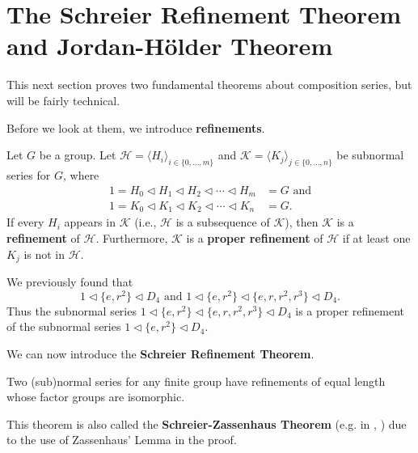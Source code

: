 \section{The Schreier Refinement Theorem and Jordan-H\"older Theorem}
This next section proves two fundamental theorems about composition series, but will be fairly technical.

Before we look at them, we introduce \textbf{refinements}.
\begin{definition}
    Let $G$ be a group. Let $\mathcal{H} = \langle H_i \rangle_{i\in\{0,\dots,m\}}$ and $\mathcal{K} = \langle K_j \rangle_{j\in\{0,\dots,n\}}$ be subnormal series for $G$, where
    \begin{align*}
        1 = H_0 \lhd H_1 \lhd H_2 \lhd \cdots \lhd H_m &= G \text{ and}\\
        1 = K_0 \lhd K_1 \lhd K_2 \lhd \cdots \lhd K_n &= G.
    \end{align*}
    If every $H_i$ appears in $\mathcal{K}$ (i.e., $\mathcal{H}$ is a subsequence of $\mathcal{K}$), then $\mathcal{K}$ is a \textbf{refinement} of $\mathcal{H}$. Furthermore, $\mathcal{K}$ is a \textbf{proper refinement} of $\mathcal{H}$ if at least one $K_j$ is not in $\mathcal{H}$.
\end{definition}
\begin{example}
    We previously found that
    \[
        1 \lhd \{e, r^2\} \lhd D_4 \text{ and } 1 \lhd \{e, r^2\} \lhd \{e, r, r^2, r^3\} \lhd D_4.    
    \]
    Thus the subnormal series $1 \lhd \{e, r^2\} \lhd \{e, r, r^2, r^3\} \lhd D_4$ is a proper refinement of the subnormal series $1 \lhd \{e, r^2\} \lhd D_4$.
\end{example}

We can now introduce the \textbf{Schreier Refinement Theorem}.
\begin{theorem}\label{thrm-schreier}
    Two (sub)normal series for any finite group have refinements of equal length whose factor groups are isomorphic.
\end{theorem}
\begin{remark}
    This theorem is also called the \textbf{Schreier-Zassenhaus Theorem} (e.g. in {\cite[\S 72]{clark_1984}}, \cite{proofwiki_schreier-zassenhaus}) due to the use of Zassenhaus' Lemma in the proof.
\end{remark}

